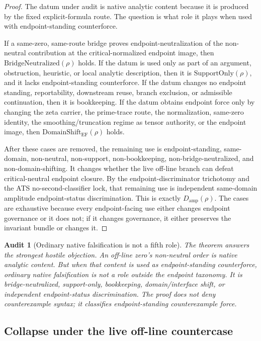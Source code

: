 \documentclass[11pt]{article}
\newtheorem{audit}{Audit}[section]
\newcommand{\Damp}{D_{\mathrm{amp}}}
\newcommand{\Support}{\mathrm{SupportOnly}}
\newcommand{\BridgeNeutralized}{\mathrm{BridgeNeutralized}}
\newcommand{\DomainShiftEF}{\mathrm{DomainShift}_{\mathrm{EF}}}
\begin{document}
\begin{proof}
The datum under audit is native analytic content because it is produced by the fixed explicit-formula route.  The question is what role it plays when used with endpoint-standing counterforce.

If a same-zero, same-route bridge proves endpoint-neutralization of the non-neutral contribution at the critical-normalized endpoint image, then \(\BridgeNeutralized(\rho)\) holds.  If the datum is used only as part of an argument, obstruction, heuristic, or local analytic description, then it is \(\Support(\rho)\), and it lacks endpoint-standing counterforce.  If the datum changes no endpoint standing, reportability, downstream reuse, branch exclusion, or admissible continuation, then it is bookkeeping.  If the datum obtains endpoint force only by changing the zeta carrier, the prime-trace route, the normalization, same-zero identity, the smoothing/truncation regime as tensor authority, or the endpoint image, then \(\DomainShiftEF(\rho)\) holds.

After these cases are removed, the remaining use is endpoint-standing, same-domain, non-neutral, non-support, non-bookkeeping, non-bridge-neutralized, and non-domain-shifting.  It changes whether the live off-line branch can defeat critical-neutral endpoint closure.  By the endpoint-discriminator trichotomy and the ATS no-second-classifier lock, that remaining use is independent same-domain amplitude endpoint-status discrimination.  This is exactly \(\Damp(\rho)\).  The cases are exhaustive because every endpoint-facing use either changes endpoint governance or it does not; if it changes governance, it either preserves the invariant bundle or changes it.
\end{proof}

\begin{audit}[Ordinary native falsification is not a fifth role]
The theorem answers the strongest hostile objection.  An off-line zero's non-neutral order is native analytic content.  But when that content is used as endpoint-standing counterforce, ordinary native falsification is not a role outside the endpoint taxonomy.  It is bridge-neutralized, support-only, bookkeeping, domain/interface shift, or independent endpoint-status discrimination.  The proof does not deny counterexample syntax; it classifies endpoint-standing counterexample force.
\end{audit}

\subsection{Collapse under the live off-line countercase}
\end{document}
